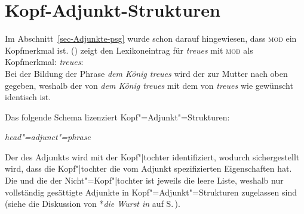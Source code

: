 \section{Kopf-Adjunkt-Strukturen}
\label{sec-Kopf-Adjunkt-Strukturen}

Im Abschnitt~\ref{sec-Adjunkte-psg} wurde schon darauf hingewiesen, dass \textsc{mod} ein Kopfmerkmal
ist. () zeigt den Lexikoneintrag für \emph{treues} mit \textsc{mod} als Kopfmerkmal:
\ea
\label{le-treue-head-mod}
\emph{treues}:\\
\z
Bei der Bildung der Phrase \emph{dem König treues} wird der \headw zur Mutter nach oben gegeben,
weshalb der \modw von \emph{dem König treues} mit dem von \emph{treues} wie gewünscht identisch ist.

Das folgende Schema lizenziert Kopf"=Adjunkt"=Strukturen:
\begin{samepage}
\begin{schema}
\label{ha-schema-prel}
\textit{head"=adjunct"=phrase} \impl\\
\end{schema}
\end{samepage}
Der \modw des Adjunkts  wird mit der Kopf"|tochter identifiziert, wodurch
sichergestellt wird, dass die Kopf"|tochter die vom Adjunkt spezifizierten Eigenschaften hat. Die
\sprl und die \compsl der Nicht"=Kopf"|tochter ist jeweils die leere Liste, weshalb nur vollständig gesättigte Adjunkte 
in Kopf"=Adjunkt"=Strukturen zugelassen sind (siehe die Diskussion von *\emph{die Wurst in} auf S.\,\pageref{ex-die-Wurst-in}).

